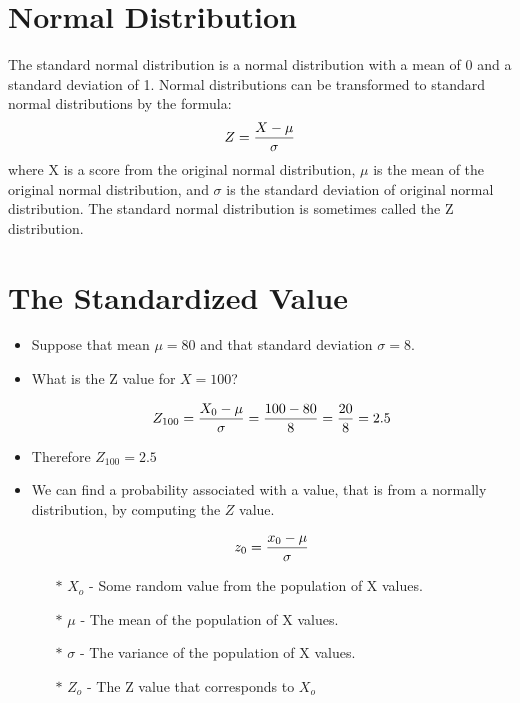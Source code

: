 \documentclass[]{report}
\begin{document}

\section{Normal Distribution}
The standard normal distribution is a normal distribution with a mean of 0 and a standard deviation of 1. 
Normal distributions can be transformed to standard normal distributions by the formula:
\[ Z = {X - \mu \over \sigma} \]
where X is a score from the original normal distribution, $\mu$ is the mean of the original normal distribution, and $\sigma$ is the standard deviation 
of original normal distribution. The standard normal distribution is sometimes called the Z distribution. 



\section{The Standardized Value}

\begin{itemize}
\item Suppose that mean $\mu = 80 $ and that standard deviation $\sigma = 8$.

\item What is the Z value for $X = 100$?

\[
Z_{100} = {X_0 - \mu \over \sigma}  = {100 - 80 \over 8} = {20 \over 8} = 2.5
\]

\item Therefore $Z_{100} = 2.5$
\end{itemize}




\begin{framed}
\begin{itemize}

\item We can find a probability associated with a value, that is from a normally distribution,  by computing the $Z$ value. 

\[z_0 = {x_0 - \mu \over \sigma}\]
\begin{itemize}
\item[$\ast$] $X_o$  - Some random value from the population of X values.
\item[$\ast$] $\mu$ - The mean of the population of X values.
\item[$\ast$] $\sigma$ - The variance of the population of X values.
\item[$\ast$] $Z_o$ - The Z value that corresponds to $X_o$
\end{itemize}
\end{itemize}
\end{framed}
\end{document}
